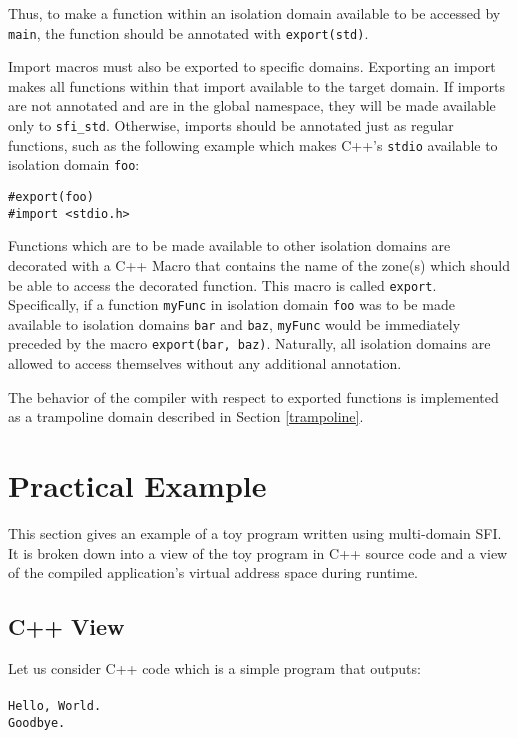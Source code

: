 \documentclass[12pt]{article}
\begin{document}
Thus, to make a function within an isolation domain available to be accessed by \texttt{main}, the function should be annotated with \texttt{export(std)}.

Import macros must also be exported to specific domains. Exporting an import makes all functions within that import available to the target domain. If imports are not annotated and are in the global namespace, they will be made available only to \texttt{sfi\_std}. Otherwise, imports should be annotated just as regular functions, such as the following example which makes C++'s \texttt{stdio} available to isolation domain \texttt{foo}:
\begin{verbatim}
#export(foo)
#import <stdio.h>
\end{verbatim}

Functions which are to be made available to other isolation domains are decorated with a C++ Macro that contains the name of the zone(s) which should be able to access the decorated function. This macro is called \texttt{export}. Specifically, if a function \texttt{myFunc} in isolation domain \texttt{foo} was to be made available to isolation domains \texttt{bar} and \texttt{baz}, \texttt{myFunc} would be immediately preceded by the macro \texttt{export(bar, baz)}. Naturally, all isolation domains are allowed to access themselves without any additional annotation.

The behavior of the compiler with respect to exported functions is implemented as a trampoline domain described in Section \ref{trampoline}.

\section{Practical Example}

This section gives an example of a toy program written using multi-domain SFI. It is broken down into a view of the toy program in C++ source code and a view of the compiled application's virtual address space during runtime.
\subsection{C++ View}

Let us consider C++ code which is a simple program that outputs:\\ \\
\texttt{Hello, World.\\Goodbye.}\\
\end{document}
